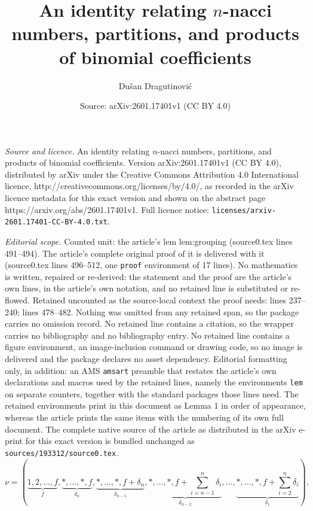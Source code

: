 \documentclass[10pt,a4paper]{amsart}
\title{An identity relating $n$-nacci numbers, partitions, and products of binomial coefficients}
\author{Du\v{s}an Dragutinovi\'c}
\date{Source: arXiv:2601.17401v1 (CC BY 4.0)}
\begin{document}
\maketitle

\noindent\emph{Source and licence.} An identity relating $n$-nacci numbers, partitions, and products of binomial coefficients. Version arXiv:2601.17401v1 (CC BY 4.0), distributed by arXiv under the Creative Commons Attribution 4.0 International licence, http://creativecommons.org/licenses/by/4.0/, as recorded in the arXiv licence metadata for this exact version and shown on the abstract page https://arxiv.org/abs/2601.17401v1. Full licence notice: \texttt{licenses/arxiv-2601.17401-CC-BY-4.0.txt}.\par\smallskip

\noindent\textit{Editorial scope.} Counted unit: the article's lem lem:grouping (source0.tex lines 491--494). The article's complete original proof of it is delivered with it (source0.tex lines 496--512, one \texttt{proof} environment of 17 lines). No mathematics is written, repaired or re-derived: the statement and the proof are the article's own lines, in the article's own notation, and no retained line is substituted or re-flowed.  Retained uncounted as the source-local context the proof needs: lines 237--240; lines 478--482.  Nothing was omitted from any retained span, so the package carries no omission record.  No retained line contains a citation, so the wrapper carries no bibliography and no bibliography entry.  No retained line contains a figure environment, an image-inclusion command or drawing code, so no image is delivered and the package declares no asset dependency.  Editorial formatting only, in addition: an AMS \texttt{amsart} preamble that restates the article's own declarations and macros used by the retained lines, namely the environments \texttt{lem} on separate counters, together with the standard packages those lines need.  The retained environments print in this document as Lemma 1 in order of appearance, whereas the article prints the same items with the numbering of its own full document.  The complete native source of the article as distributed in the arXiv e-print for this exact version is bundled unchanged as \texttt{sources/193312/source0.tex}.
\begin{equation}
  \nu =      (\underbrace{1, 2, \ldots, f}_{f}, \underbrace{*, \ldots, *, f}_{\delta_n}, \underbrace{*, \ldots, *, f + \delta_n}_{\delta_{n-1}}, \underbrace{*, \ldots, *, f + \sum_{i = n-1}^n\delta_i}_{\delta_{n-2}}, \ldots,  \underbrace{*, \ldots, *, f + \sum_{i = 2}^n \delta_i}_{\delta_1}),  
\label{eqn:nu_det_by_delta}
\end{equation}
\end{document}
